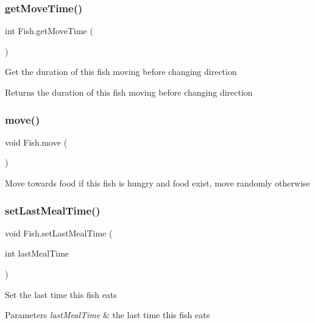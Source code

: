 \subsubsection{\texorpdfstring{get\+Move\+Time()}{getMoveTime()}}
{\footnotesize\ttfamily int Fish.\+get\+Move\+Time (\begin{DoxyParamCaption}{ }\end{DoxyParamCaption})\hspace{0.3cm}{\ttfamily [inline]}}

Get the duration of this fish moving before changing direction \begin{DoxyReturn}{Returns}
the duration of this fish moving before changing direction 
\end{DoxyReturn}
\mbox{\label{class_fish_ad624caf044894e5c4350cd69ef846833}} 
\subsubsection{\texorpdfstring{move()}{move()}}
{\footnotesize\ttfamily void Fish.\+move (\begin{DoxyParamCaption}{ }\end{DoxyParamCaption})\hspace{0.3cm}{\ttfamily [inline]}}

Move towards food if this fish is hungry and food exist, move randomly otherwise \mbox{\label{class_fish_aedb34efda974a200bd6b929e26955080}} 
\subsubsection{\texorpdfstring{set\+Last\+Meal\+Time()}{setLastMealTime()}}
{\footnotesize\ttfamily void Fish.\+set\+Last\+Meal\+Time (\begin{DoxyParamCaption}\item[{int}]{last\+Meal\+Time }\end{DoxyParamCaption})\hspace{0.3cm}{\ttfamily [inline]}}

Set the last time this fish eats 
\begin{DoxyParams}{Parameters}
{\em last\+Meal\+Time} & the last time this fish eats \\
\hline
\end{DoxyParams}
\mbox{\label{class_fish_a5c8ba21e13233735384d25a521a6b022}} 
